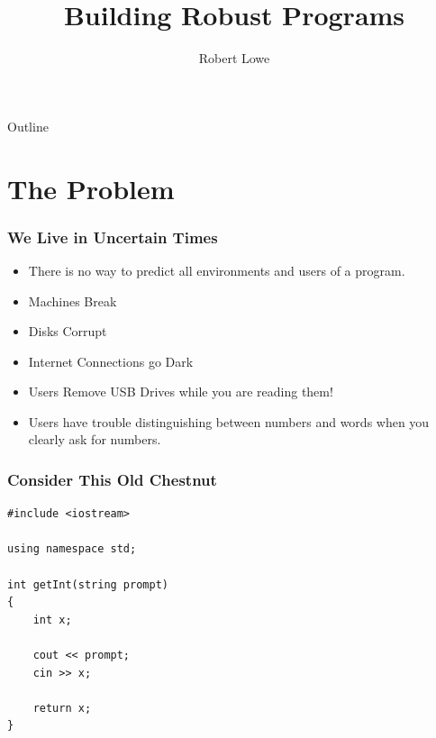 \documentclass{beamer}
\title{Building Robust Programs}
\author{Robert Lowe\\}
\institute[Maryville College] %
{
  Division of Mathematics and Computer Science\\
  Maryville College
}
\date[]{}
\begin{document}
\begin{frame}
  \titlepage
\end{frame}

\begin{frame}{Outline}
  \tableofcontents
\end{frame}





\section{The Problem}
\begin{frame}
    \frametitle{We Live in Uncertain Times}
    \begin{itemize}[<+->]
        \item There is no way to predict all environments and users of a program.
        \item Machines Break
        \item Disks Corrupt
        \item Internet Connections go Dark
        \item Users Remove USB Drives while you are reading them!
        \item Users have trouble distinguishing between numbers and words when you clearly ask for numbers.
    \end{itemize}
\end{frame}

\begin{frame}[fragile]
    \frametitle{Consider This Old Chestnut}
    \begin{verbatim}
#include <iostream>

using namespace std;

int getInt(string prompt)
{
    int x;
    
    cout << prompt;
    cin >> x;
    
    return x;
}
\end{verbatim}
\end{frame}
\end{document}
